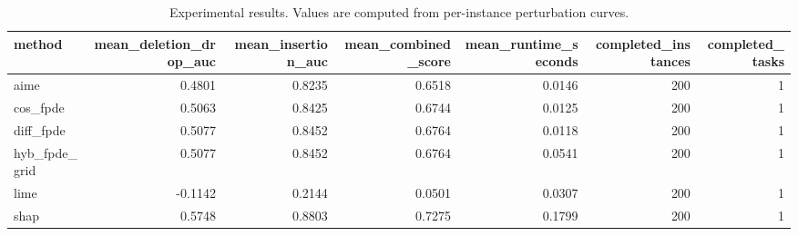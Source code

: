 \begin{table}[t]
\caption{Experimental results. Values are computed from per-instance perturbation curves.}
\label{tab:main_results_computed}
\centering
\begin{tabular}{lrrrrrr}
\toprule
method & mean\_deletion\_drop\_auc & mean\_insertion\_auc & mean\_combined\_score & mean\_runtime\_seconds & completed\_instances & completed\_tasks \\
\midrule
aime & 0.4801 & 0.8235 & 0.6518 & 0.0146 & 200 & 1 \\
cos\_fpde & 0.5063 & 0.8425 & 0.6744 & 0.0125 & 200 & 1 \\
diff\_fpde & 0.5077 & 0.8452 & 0.6764 & 0.0118 & 200 & 1 \\
hyb\_fpde\_grid & 0.5077 & 0.8452 & 0.6764 & 0.0541 & 200 & 1 \\
lime & -0.1142 & 0.2144 & 0.0501 & 0.0307 & 200 & 1 \\
shap & 0.5748 & 0.8803 & 0.7275 & 0.1799 & 200 & 1 \\
\bottomrule
\end{tabular}

\end{table}

